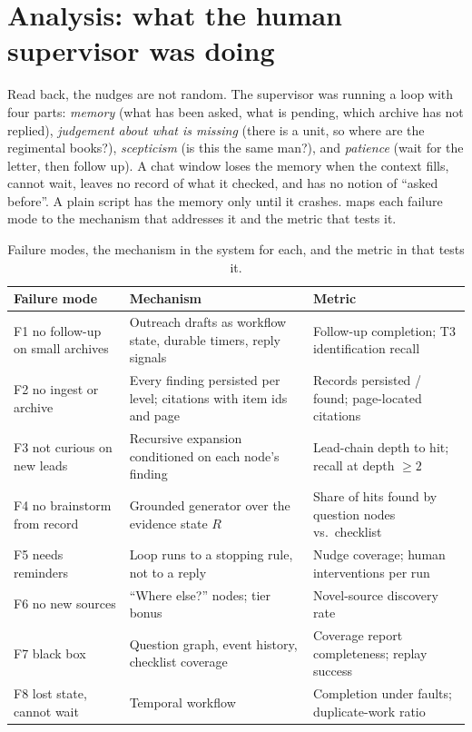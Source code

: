 \section{Analysis: what the human supervisor was doing}
\label{sec:analysis}

Read back, the nudges are not random. The supervisor was running a loop with four parts: \emph{memory} (what has been asked, what is pending, which archive has not replied), \emph{judgement about what is missing} (there is a unit, so where are the regimental books?), \emph{scepticism} (is this the same man?), and \emph{patience} (wait for the letter, then follow up). A chat window loses the memory when the context fills, cannot wait, leaves no record of what it checked, and has no notion of ``asked before''. A plain script has the memory only until it crashes.  maps each failure mode to the mechanism that addresses it and the metric that tests it.

\begin{table}[t]
\centering\small
\begin{tabularx}{\textwidth}{@{}l>{\raggedright\arraybackslash}X>{\raggedright\arraybackslash}X@{}}
\toprule
Failure mode & Mechanism & Metric \\
\midrule
F1 no follow-up on small archives & Outreach drafts as workflow state, durable timers, reply signals & Follow-up completion; T3 identification recall \\
F2 no ingest or archive & Every finding persisted per level; citations with item ids and page & Records persisted / found; page-located citations \\
F3 not curious on new leads & Recursive expansion conditioned on each node's finding & Lead-chain depth to hit; recall at depth $\ge 2$ \\
F4 no brainstorm from record & Grounded generator over the evidence state $R$ & Share of hits found by question nodes vs.\ checklist \\
F5 needs reminders & Loop runs to a stopping rule, not to a reply & Nudge coverage; human interventions per run \\
F6 no new sources & ``Where else?'' nodes; tier bonus & Novel-source discovery rate \\
F7 black box & Question graph, event history, checklist coverage & Coverage report completeness; replay success \\
F8 lost state, cannot wait & Temporal workflow & Completion under faults; duplicate-work ratio \\
\bottomrule
\end{tabularx}
\caption{Failure modes, the mechanism in the system for each, and the metric in \bench that tests it.}
\label{tab:fmm}
\end{table}
